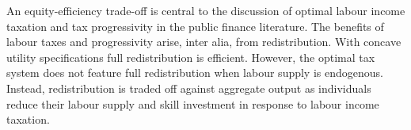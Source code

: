 



% 

\begin{comment}
\textcolor{violet}{Still to do:
\begin{itemize}
	\item possibilities to model technical change: substitutability of goods, growth in sector, innovation on substitutability versus consumption growth
\end{itemize}
}

content...
\end{comment}

An equity-efficiency trade-off is central to the discussion of optimal labour income taxation and tax progressivity in the public finance literature.  The benefits of labour taxes and progressivity arise, inter alia, from redistribution. %
With concave utility specifications full redistribution is efficient. However, the optimal tax system does not feature full redistribution when labour supply is endogenous. Instead, redistribution is traded off against aggregate output as individuals reduce their labour supply and skill investment in response to labour income taxation. 

